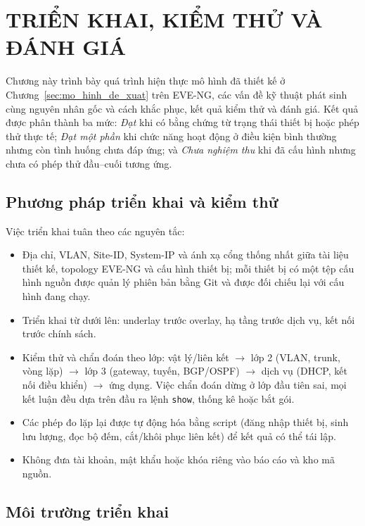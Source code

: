 \section{TRIỂN KHAI, KIỂM THỬ VÀ ĐÁNH GIÁ}\label{sec:trien_khai_danh_gia}

Chương này trình bày quá trình hiện thực mô hình đã thiết kế ở Chương~\ref{sec:mo_hinh_de_xuat} trên EVE-NG, các vấn đề kỹ thuật phát sinh cùng nguyên nhân gốc và cách khắc phục, kết quả kiểm thử và đánh giá. Kết quả được phân thành ba mức: \textit{Đạt} khi có bằng chứng từ trạng thái thiết bị hoặc phép thử thực tế; \textit{Đạt một phần} khi chức năng hoạt động ở điều kiện bình thường nhưng còn tình huống chưa đáp ứng; và \textit{Chưa nghiệm thu} khi đã cấu hình nhưng chưa có phép thử đầu--cuối tương ứng.

\subsection{Phương pháp triển khai và kiểm thử}

Việc triển khai tuân theo các nguyên tắc:
\begin{itemize}
    \item Địa chỉ, VLAN, Site-ID, System-IP và ánh xạ cổng thống nhất giữa tài liệu thiết kế, topology EVE-NG và cấu hình thiết bị; mỗi thiết bị có một tệp cấu hình nguồn được quản lý phiên bản bằng Git và được đối chiếu lại với cấu hình đang chạy.
    \item Triển khai từ dưới lên: underlay trước overlay, hạ tầng trước dịch vụ, kết nối trước chính sách.
    \item Kiểm thử và chẩn đoán theo lớp: vật lý/liên kết $\rightarrow$ lớp 2 (VLAN, trunk, vòng lặp) $\rightarrow$ lớp 3 (gateway, tuyến, BGP/OSPF) $\rightarrow$ dịch vụ (DHCP, kết nối điều khiển) $\rightarrow$ ứng dụng. Việc chẩn đoán dừng ở lớp đầu tiên sai, mọi kết luận đều dựa trên đầu ra lệnh \texttt{show}, thống kê hoặc bắt gói.
    \item Các phép đo lặp lại được tự động hóa bằng script (đăng nhập thiết bị, sinh lưu lượng, đọc bộ đếm, cắt/khôi phục liên kết) để kết quả có thể tái lập.
    \item Không đưa tài khoản, mật khẩu hoặc khóa riêng vào báo cáo và kho mã nguồn.
\end{itemize}

\subsection{Môi trường triển khai}

